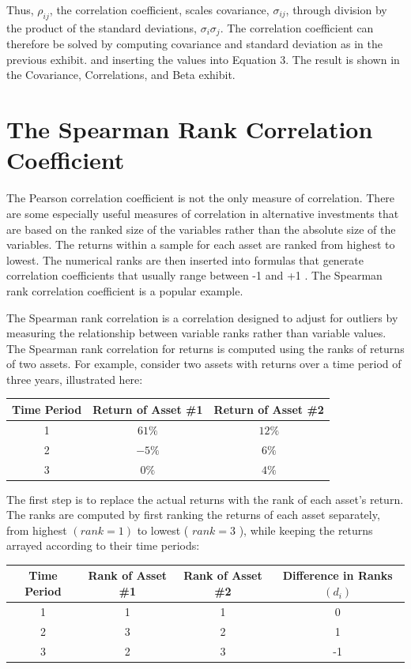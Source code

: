 \documentclass[11pt]{article}
\begin{document}
Thus, $\rho_{i j}$, the correlation coefficient, scales covariance, $\sigma_{i j}$, through division by the product of the standard deviations, $\sigma_{i} \sigma_{j}$. The correlation coefficient can therefore be solved by computing covariance and standard deviation as in the previous exhibit. and inserting the values into Equation 3. The result is shown in the Covariance, Correlations, and Beta exhibit.

\section*{The Spearman Rank Correlation Coefficient}
The Pearson correlation coefficient is not the only measure of correlation. There are some especially useful measures of correlation in alternative investments that are based on the ranked size of the variables rather than the absolute size of the variables. The returns within a sample for each asset are ranked from highest to lowest. The numerical ranks are then inserted into formulas that generate correlation coefficients that usually range between -1 and +1 . The Spearman rank correlation coefficient is a popular example.

The Spearman rank correlation is a correlation designed to adjust for outliers by measuring the relationship between variable ranks rather than variable values. The Spearman rank correlation for returns is computed using the ranks of returns of two assets. For example, consider two assets with returns over a time period of three years, illustrated here:

\begin{center}
\begin{tabular}{|c|c|c|}
\hline
Time Period & Return of Asset \#1 & Return of Asset \#2 \\
\hline
1 & $61 \%$ & $12 \%$ \\
\hline
2 & $-5 \%$ & $6 \%$ \\
\hline
3 & $0 \%$ & $4 \%$ \\
\hline
\end{tabular}
\end{center}

The first step is to replace the actual returns with the rank of each asset's return. The ranks are computed by first ranking the returns of each asset separately, from highest $(r a n k=1)$ to lowest ( $r a n k=3$ ), while keeping the returns arrayed according to their time periods:

\begin{center}
\begin{tabular}{|c|c|c|c|}
\hline
Time Period & Rank of Asset \#1 & Rank of Asset \#2 & Difference in Ranks $\left(d_{i}\right)$ \\
\hline
1 & 1 & 1 & 0 \\
\hline
2 & 3 & 2 & 1 \\
\hline
3 & 2 & 3 & -1 \\
\hline
\end{tabular}
\end{center}
\end{document}
